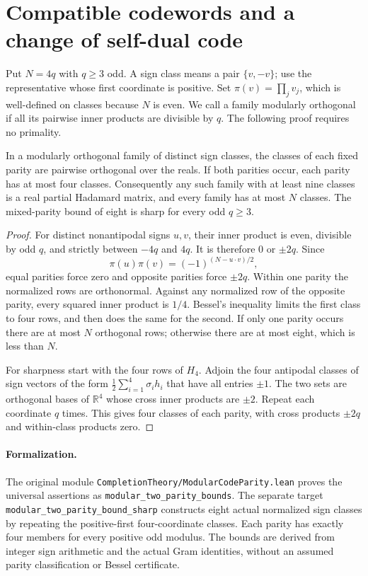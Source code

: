 \section{Compatible codewords and a change of self-dual code}
\label{sec:compatible-codes}

Put $N=4q$ with $q\ge3$ odd. A sign class means a pair $\{v,-v\}$;
use the representative whose first coordinate is positive. Set
$\pi(v)=\prod_jv_j$, which is well-defined on classes because $N$ is even.
We call a family modularly orthogonal if all its pairwise inner products
are divisible by $q$. The following proof requires no primality.

\begin{theorem}\label{code:parity}
In a modularly orthogonal family of distinct sign classes, the
classes of each fixed parity are pairwise orthogonal over the reals.
If both parities occur, each parity has at most four classes.
Consequently any such family with at least nine classes is a real
partial Hadamard matrix, and every family has at most $N$ classes.
The mixed-parity bound of eight is sharp for every odd $q\ge3$.
\end{theorem}
\begin{proof}
For distinct nonantipodal signs $u,v$, their inner product is even,
divisible by odd $q$, and strictly between $-4q$ and $4q$. It is
therefore $0$ or $\pm2q$. Since
\[
 \pi(u)\pi(v)=(-1)^{(N-u\cdot v)/2},
\]
equal parities force zero and opposite parities force $\pm2q$.
Within one parity the normalized rows are orthonormal. Against
any normalized row of the opposite parity, every squared inner
product is $1/4$. Bessel's inequality limits the first class to
four rows, and then does the same for the second.
If only one parity occurs there are at most $N$ orthogonal rows;
otherwise there are at most eight, which is less than $N$.

For sharpness start with the four rows of $H_4$. Adjoin the four
antipodal classes of sign vectors of the form
$\frac12\sum_{i=1}^4\sigma_i h_i$ that have all entries $\pm1$.
The two sets are orthogonal bases of $\mathbb R^4$ whose cross
inner products are $\pm2$. Repeat each coordinate $q$ times.
This gives four classes of each parity, with cross products
$\pm2q$ and within-class products zero.
\end{proof}

\paragraph{Formalization.}
The original module
\texttt{CompletionTheory/\allowbreak ModularCodeParity.lean}
proves the universal assertions as
\texttt{modular\_\allowbreak two\_\allowbreak parity\_\allowbreak bounds}.
The separate target
\texttt{modular\_\allowbreak two\_\allowbreak parity\_\allowbreak bound\_\allowbreak sharp}
constructs eight actual normalized sign classes by repeating the
positive-first four-coordinate classes. Each parity has exactly four
members for every positive odd modulus. The bounds are derived from
integer sign arithmetic and the actual Gram identities, without an
assumed parity classification or Bessel certificate.

